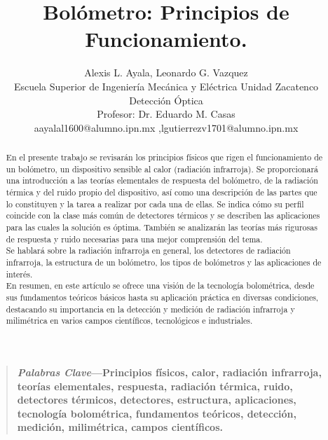 \documentclass[a4paper,journal]{IEEEtran}
\begin{document}
\title{Bolómetro: Principios de Funcionamiento.\\}
\author{Alexis L. Ayala, Leonardo G. Vazquez\\Escuela Superior de Ingeniería Mecánica y Eléctrica Unidad Zacatenco\\ Detección Óptica\\Profesor: Dr. Eduardo M. Casas\\ aayalal1600@alumno.ipn.mx ,lgutierrezv1701@alumno.ipn.mx}
\maketitle
\begin{abstract}
  En el presente trabajo se revisarán los principios físicos que rigen el funcionamiento de un bolómetro, un dispositivo sensible al calor (radiación infrarroja). Se proporcionará una introducción a las teorías elementales de respuesta del bolómetro, de la radiación térmica y del ruido propio del dispositivo, así como una descripción de las partes que lo constituyen y la tarea a realizar por cada una de ellas. Se indica cómo su perfil coincide con la clase más común de detectores térmicos y se describen las aplicaciones para las cuales la solución es óptima. También se analizarán las teorías más rigurosas de respuesta y ruido necesarias para una mejor comprensión del tema.\\ 
  Se hablará sobre la radiación infrarroja en general, los detectores de radiación infrarroja, la estructura de un bolómetro, los tipos de bolómetros y las aplicaciones de interés. \\
  En resumen, en este artículo se ofrece una visión de la tecnología bolométrica, desde sus fundamentos teóricos básicos hasta su aplicación práctica en diversas condiciones, destacando su importancia en la detección y medición de radiación infrarroja y milimétrica en varios campos científicos, tecnológicos e industriales. 
\end{abstract}
\begin{quote}
        \bf
        \small
        \emph{Palabras Clave}—Principios físicos, calor, radiación infrarroja, teorías elementales, respuesta, radiación térmica, ruido, detectores térmicos, detectores, estructura, aplicaciones, tecnología bolométrica, fundamentos teóricos, detección, medición, milimétrica, campos científicos. 
\end{quote}
\end{document}
